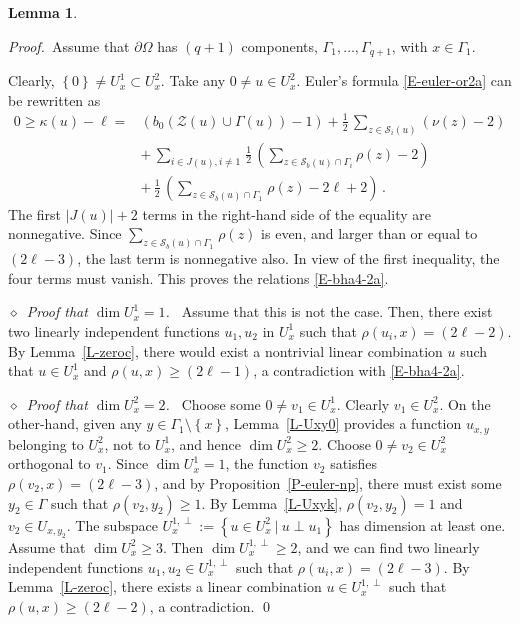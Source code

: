 \documentclass[12pt,a4paper]{amsart}
\theoremstyle{plain} %
\newtheorem{lemma}[theorem]{Lemma}
\theoremstyle{definition}
\numberwithin{equation}{section}
\numberwithin{figure}{section}
\numberwithin{table}{section}
\newcommand{\cS}{\mathcal{S}}
\newcommand{\cZ}{\mathcal{Z}}
\newcommand{\pf}{\emph{Proof.~}}
\newcommand{\sm}{\!\setminus\!}
\newcommand{\set}[1]{\left\lbrace #1 \right\rbrace}
\newcommand{\noid}{\noindent $\diamond$~}
\begin{document}
{\begin{lemma}
\begin{enumerate}[(i)]
\end{enumerate}
\end{lemma}%

\pf Assume that $\partial \Omega$ has $(q+1)$ components, $\Gamma_1, \ldots, \Gamma_{q+1}$, with $x \in \Gamma_1$.\smallskip

Clearly, $\set{0} \neq U_x^1 \subset U_x^2$. Take any $0 \not = u \in U^2_x$. Euler's formula \eqref{E-euler-or2a} can be rewritten as
%
\begin{equation}\label{E-bha4-2e}
\begin{array}{ll}
0 \ge \kappa(u) - \ell =& \left( b_0(\cZ(u) \cup \Gamma(u)) - 1 \right)
+ \frac 12\, \sum_{z \in \cS_i(u)} (\nu(z)-2)\\[5pt]
& +\, \sum_{i \in J(u), i\neq 1\,} \frac 12 \, \left( \sum_{z\in \cS _b(u) \cap \Gamma_i}\rho (z) - 2 \right)\\[5pt]
& +\, \frac 12\, \left( \sum_{z\in \cS _b(u) \cap \Gamma_1\,}\rho (z)  - 2\ell +2\right)\,.
\end{array}%
\end{equation}
%
The first $ |J(u)|+2$  terms in the right-hand side of the equality are nonnegative. Since $\sum_{z\in \cS _b(u) \cap \Gamma_1\,}\rho (z)$ is even, and larger than or equal to $(2\ell -3)$, the last term is nonnegative also. In view of the first inequality, the four terms must vanish. This proves the relations \eqref{E-bha4-2a}.
\medskip

\noid \emph{Proof that $\dim U^1_x = 1$.~}  Assume that this is not the case. Then, there exist two linearly independent functions $u_1, u_2$ in $U^1_x$ such that $\rho(u_i,x) = (2\ell - 2)$. By Lemma~\ref{L-zeroc}, there would exist a nontrivial linear combination $u$ such that $u \in U^1_x$ and $\rho(u,x) \ge (2\ell - 1)$, a contradiction with \eqref{E-bha4-2a}. \medskip


\noid \emph{Proof that $\dim U^2_x = 2$.~} Choose some $0 \not = v_1 \in U^1_x$. Clearly $v_1 \in U^2_x$. On the other-hand, given any $y \in \Gamma_1\sm\set{x}$, Lemma~\ref{L-Uxy0} provides a function $u_{x,y}$ belonging to $U^2_x$, not to $U^1_x$, and hence $\dim U^2_x \ge 2$. Choose $0 \not = v_2 \in U^2_x$ orthogonal to $v_1$. Since $\dim U^1_x = 1$, the function $v_2$ satisfies $\rho(v_2,x) = (2\ell - 3)$, and by Proposition~\ref{P-euler-np}, there must exist some $y_2 \in \Gamma$ such that $\rho(v_2,y_2) \ge 1$.  By Lemma~\ref{L-Uxyk}, $\rho(v_2,y_2) = 1$ and $v_2 \in U_{x,y_2}$. The subspace $U^{1,\perp}_x := \set{u \in U^2_x ~|~ u \perp u_1}$ has dimension at least one. Assume that $\dim U^2_x \ge 3$. Then $\dim U^{1,\perp}_x \ge 2$, and we can find two linearly independent functions $u_1, u_2 \in U^{1,\perp}_x$ such that $\rho(u_i,x) = (2\ell - 3)$. By Lemma~\ref{L-zeroc}, there exists a linear combination $u \in U^{1,\perp}_x$ such that $\rho(u,x) \ge (2\ell - 2)$, a contradiction.  \hfill \qed \medskip


}
\end{document}
